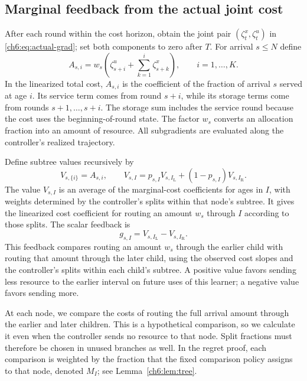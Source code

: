 \documentclass[11pt]{article}
\theoremstyle{plain}
\theoremstyle{remark}
\numberwithin{equation}{section}
\begin{document}
\subsection{Marginal feedback from the actual joint cost}
After each round within the cost horizon, obtain the joint pair
$(\zeta_t^x,\zeta_t^u)$ in \eqref{ch6:eq:actual-grad}; set both components to zero
after $T$. For arrival $s\le N$ define
\begin{equation}\label{ch6:eq:leaf}
 A_{s,i}=w_s\left(\zeta_{s+i}^u+\sum_{k=1}^{i}\zeta_{s+k}^x\right),
 \qquad i=1,\ldots,K.
\end{equation}
In the linearized total cost, $A_{s,i}$ is the coefficient of the fraction
of arrival $s$ served at age $i$. Its service term comes from round $s+i$,
while its storage terms come from rounds $s+1,\ldots,s+i$. The storage sum
includes the service round because the cost uses the beginning-of-round
state. The factor $w_s$ converts an allocation fraction into an amount of
resource. All subgradients are evaluated along the controller's realized
trajectory.

Define subtree values recursively by
\begin{equation}\label{ch6:eq:values}
 V_{s,\{i\}}=A_{s,i},\qquad
 V_{s,I}=p_{s,I}V_{s,I_{\mathrm{L}}}+(1-p_{s,I})V_{s,I_{\mathrm{R}}}.
\end{equation}
The value $V_{s,I}$ is an average of the marginal-cost coefficients for
ages in $I$, with weights determined by the controller's splits within that
node's subtree. It gives the linearized cost coefficient for routing an amount $w_s$
through $I$ according to those splits.
The scalar feedback is
\begin{equation}\label{ch6:eq:g}
 g_{s,I}=V_{s,I_{\mathrm{L}}}-V_{s,I_{\mathrm{R}}}.
\end{equation}
This feedback compares routing an amount $w_s$ through the earlier child
with routing that amount through the later child, using the observed cost
slopes and the controller's splits within each child's subtree. A positive value
favors sending less resource to the earlier interval on future uses of
this learner; a negative value favors sending more.

At each node, we compare the costs of routing the full arrival amount
through the earlier and later children. This is a hypothetical comparison,
so we calculate it even when the controller sends no resource to that
node. Split fractions must therefore be chosen in unused branches as
well. In the regret proof, each comparison is weighted by the fraction
that the fixed comparison policy assigns to that node, denoted $M_I$;
see Lemma~\ref{ch6:lem:tree}.
\end{document}
